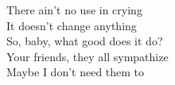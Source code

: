 There ain't no use in crying \\
It doesn't change anything \\
So, baby, what good does it do? \\
Your friends, they all sympathize \\
Maybe I don't need them to 


